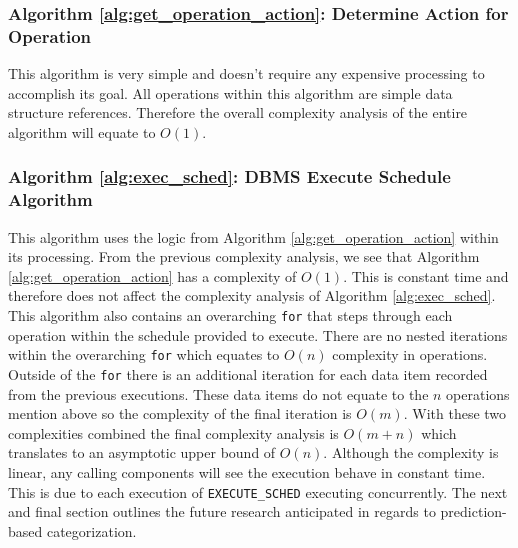\documentclass[conference]{IEEEtran}
\begin{document}

\subsubsection{Algorithm \ref{alg:get_operation_action}: Determine Action for Operation}
\label{alg_complexity:get_action}
This algorithm is very simple and doesn't require any expensive processing to accomplish its goal. All operations within this algorithm are simple data structure references. Therefore the overall complexity analysis of the entire algorithm will equate to $O(1)$.

\subsubsection{Algorithm \ref{alg:exec_sched}: DBMS Execute Schedule Algorithm}
\label{alg_complexity:exec_sched}
This algorithm uses the logic from Algorithm \ref{alg:get_operation_action} within its processing. From the previous complexity analysis, we see that Algorithm \ref{alg:get_operation_action} has a complexity of $O(1)$. This is constant time and therefore does not affect the complexity analysis of Algorithm \ref{alg:exec_sched}. This algorithm also contains an overarching \verb|for| that steps through each operation within the schedule provided to execute. There are no nested iterations within the overarching \verb|for| which equates to $O(n)$ complexity in operations. Outside of the \verb|for| there is an additional iteration for each data item recorded from the previous executions. These data items do not equate to the $n$ operations mention above so the complexity of the final iteration is $O(m)$. With these two complexities combined the final complexity analysis is $O(m+n)$ which translates to an asymptotic upper bound of $O(n)$. Although the complexity is linear, any calling components will see the execution behave in constant time. This is due to each execution of \verb|EXECUTE_SCHED| executing concurrently. The next and final section outlines the future research anticipated in regards to prediction-based categorization.
\end{document}
